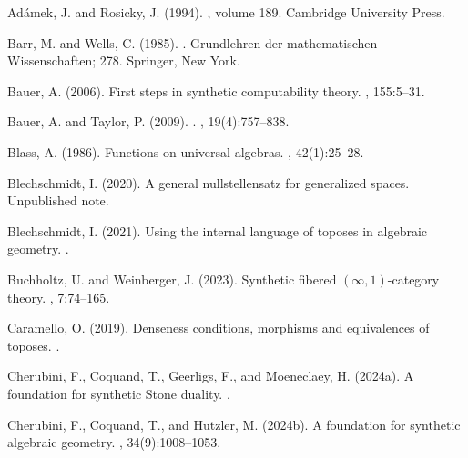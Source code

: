 \documentclass{msc}
\theoremstyle{theormstyle}
\theoremstyle{remarkstyle}
\begin{document}
\begin{thebibliography}{}

Ad{\'a}mek, J. and Rosicky, J. (1994).
, volume 189.
\newblock Cambridge University Press.

Barr, M. and Wells, C. (1985).
.
\newblock Grundlehren der mathematischen Wissenschaften; 278. Springer, New York.

Bauer, A. (2006).
\newblock First steps in synthetic computability theory.
, 155:5--31.

Bauer, A. and Taylor, P. (2009).
.
, 19(4):757--838.

Blass, A. (1986).
\newblock Functions on universal algebras.
, 42(1):25--28.

Blechschmidt, I. (2020).
\newblock A general nullstellensatz for generalized spaces.
\newblock Unpublished note.

Blechschmidt, I. (2021).
\newblock Using the internal language of toposes in algebraic geometry.
.

Buchholtz, U. and Weinberger, J. (2023).
\newblock Synthetic fibered $(\infty, 1)$-category theory.
, 7:74--165.

Caramello, O. (2019).
\newblock Denseness conditions, morphisms and equivalences of toposes.
.

Cherubini, F., Coquand, T., Geerligs, F., and Moeneclaey, H. (2024a).
\newblock A foundation for synthetic {Stone} duality.
.

Cherubini, F., Coquand, T., and Hutzler, M. (2024b).
\newblock A foundation for synthetic algebraic geometry.
, 34(9):1008--1053.


\end{thebibliography}
\end{document}
